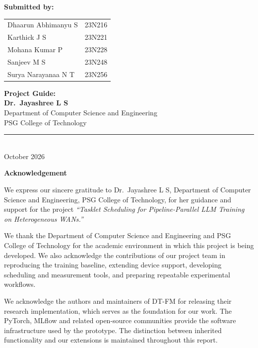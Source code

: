 \begin{titlepage}
  \vspace{0.8cm}
  \begin{minipage}[t]{0.61\textwidth}
    \raggedright
    \textbf{Submitted by:}\\[0.4em]
    \begin{tabular}{@{}ll@{}}
      Dhaarun Abhimanyu S & 23N216\\[0.25em]
      Karthick J S & 23N221\\[0.25em]
      Mohana Kumar P & 23N228\\[0.25em]
      Sanjeev M S & 23N248\\[0.25em]
      Surya Narayanaa N T & 23N256
    \end{tabular}
  \end{minipage}
  \hfill
  \begin{minipage}[t]{0.35\textwidth}
    \raggedleft
    \textbf{Project Guide:}\\[0.4em]
    {\large\bfseries Dr.\ Jayashree L S}\\[0.35em]
    Department of Computer Science and Engineering\\
    PSG College of Technology
  \end{minipage}

  \vfill
  \rule{0.85\textwidth}{0.5pt}\\[0.3cm]
  {\large October 2026}
\end{titlepage}

\thispagestyle{fancy}
\vspace*{0.16\textheight}
\begin{center}
  {\Large\bfseries Acknowledgement}
\end{center}
\vspace{0.7cm}

We express our sincere gratitude to Dr.\ Jayashree L S, Department of Computer Science and Engineering, PSG College of Technology, for her guidance and support for the project \textit{``Tasklet Scheduling for Pipeline-Parallel LLM Training on Heterogeneous WANs.''}

We thank the Department of Computer Science and Engineering and PSG College of Technology for the academic environment in which this project is being developed. We also acknowledge the contributions of our project team in reproducing the training baseline, extending device support, developing scheduling and measurement tools, and preparing repeatable experimental workflows.

We acknowledge the authors and maintainers of DT-FM for releasing their research implementation, which serves as the foundation for our work. The PyTorch, MLflow and related open-source communities provide the software infrastructure used by the prototype. The distinction between inherited functionality and our extensions is maintained throughout this report.

